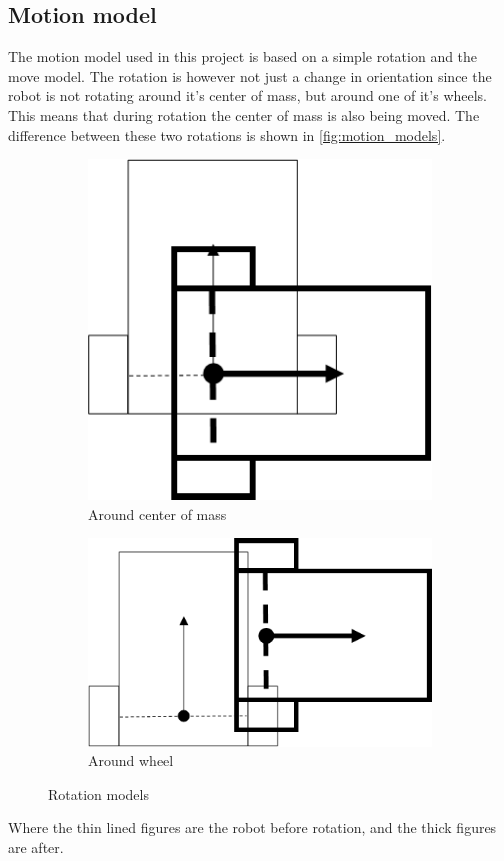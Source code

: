 \documentclass[Main]{subfiles}
\begin{document}
	\subsection{Motion model} %
		\label{sub:motion_model}
The motion model used in this project is based on a simple rotation and the move model.
The rotation is however not just a change in orientation since the robot is not rotating around it's center of mass, but around one of it's wheels.
This means that during rotation the center of mass is also being moved.
The difference between these two rotations is shown in \autoref{fig:motion_models}.
\begin{figure}[H]
	\centering
	\begin{subfigure}[b]{0.45\linewidth}
		\includegraphics[scale=0.8]{./Figures/motion_model1.png}
		\caption{Around center of mass}
		\label{fig:motion_model1}
	\end{subfigure}	
	\begin{subfigure}[b]{0.45\linewidth}
		\includegraphics[scale=0.8]{./Figures/motion_model2.png}
		\caption{Around wheel}
		\label{fig:motion_model2}
	\end{subfigure}
\caption{Rotation models}
\label{fig:motion_models}
\end{figure}
Where the thin lined figures are the robot before rotation, and the thick figures are after.
\end{document}
